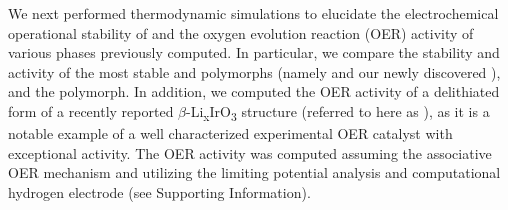 %



%
%
We next performed  thermodynamic simulations to elucidate the electrochemical operational stability of \IrOx and the oxygen evolution reaction (OER) activity of various \IrOthree phases previously computed.
%
In particular, we compare the stability and activity of the most stable \IrOtwo and \IrOthree polymorphs
(namely \rIrOtwo and our newly discovered \aIrOthree),
and the \rIrOthree polymorph.
%
In addition, we computed the OER activity of a delithiated form of a recently reported $\beta$-Li\textsubscript{x}IrO\textsubscript{3} structure
(referred to here as \bIrOthree),
as it is a notable example of a well characterized experimental \IrOthree OER catalyst with exceptional activity.
\cite{Pearce2017,Pearce2019}
%
The OER activity was computed assuming the associative OER mechanism and utilizing the limiting potential analysis and computational hydrogen electrode (see Supporting Information).
\cite{Man2011,Rossmeisl2007,Kitchin2004}


